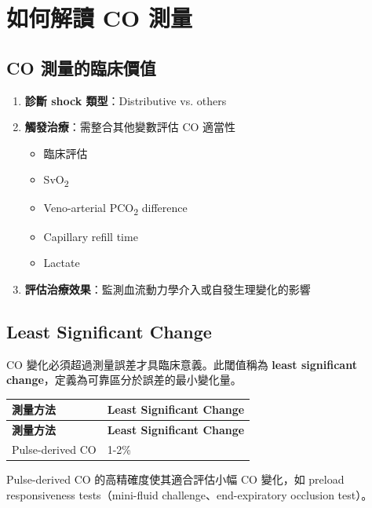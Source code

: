 \documentclass[11pt,a4paper]{article}
\begin{document}
\section{如何解讀 CO 測量}

\subsection{CO 測量的臨床價值}

\begin{enumerate}
    \item \textbf{診斷 shock 類型}：Distributive vs. others
    \item \textbf{觸發治療}：需整合其他變數評估 CO 適當性
    \begin{itemize}
        \item 臨床評估
        \item SvO\textsubscript{2}
        \item Veno-arterial PCO\textsubscript{2} difference
        \item Capillary refill time
        \item Lactate
    \end{itemize}
    \item \textbf{評估治療效果}：監測血流動力學介入或自發生理變化的影響
\end{enumerate}


\subsection{Least Significant Change}

CO 變化必須超過測量誤差才具臨床意義。此閾值稱為 \textbf{least significant change}，定義為可靠區分於誤差的最小變化量。

\begin{longtable}{p{5cm}p{9cm}}
\toprule
\textbf{測量方法} & \textbf{Least Significant Change} \\
\midrule
\endfirsthead
\toprule
\textbf{測量方法} & \textbf{Least Significant Change} \\
\midrule
\endhead
Pulse-derived CO & 1-2\% \\
\bottomrule
\end{longtable}

Pulse-derived CO 的高精確度使其適合評估小幅 CO 變化，如 preload responsiveness tests（mini-fluid challenge、end-expiratory occlusion test）。
\end{document}
